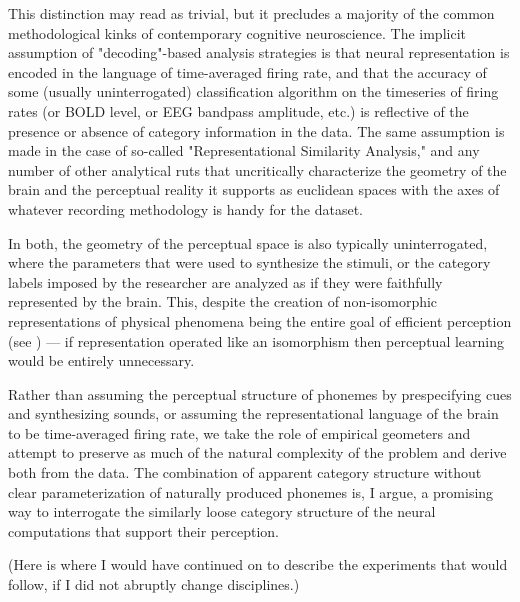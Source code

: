 This distinction may read as trivial, but it precludes a majority of the common methodological kinks of contemporary cognitive neuroscience. The implicit assumption of "decoding"-based analysis strategies is that neural representation is encoded in the language of time-averaged firing rate, and that the accuracy of some (usually uninterrogated) classification algorithm on the timeseries of firing rates (or BOLD level, or EEG bandpass amplitude, etc.) is reflective of the presence or absence of category information in the data. The same assumption is made in the case of so-called "Representational Similarity Analysis," and any number of other analytical ruts that uncritically characterize the geometry of the brain and the perceptual reality it supports as euclidean spaces with the axes of whatever recording methodology is handy for the dataset. 

In both, the geometry of the perceptual space is also typically uninterrogated, where the parameters that were used to synthesize the stimuli, or the category labels imposed by the researcher are analyzed as if they were faithfully represented by the brain. This, despite the creation of non-isomorphic representations of physical phenomena being the entire goal of efficient perception (see \citep{stilpEfficientCodingStatistically2012,wangNeuralCodingStrategies2007}) --- if representation operated like an isomorphism then perceptual learning would be entirely unnecessary.

Rather than assuming the perceptual structure of phonemes by prespecifying cues and synthesizing sounds, or assuming the representational language of the brain to be time-averaged firing rate, we take the role of empirical geometers and attempt to preserve as much of the natural complexity of the problem and derive both from the data. The combination of apparent category structure without clear parameterization of naturally produced phonemes is, I argue, a promising way to interrogate the similarly loose category structure of the neural computations that support their perception.

(Here is where I would have continued on to describe the experiments that would follow, if I did not abruptly change disciplines.)